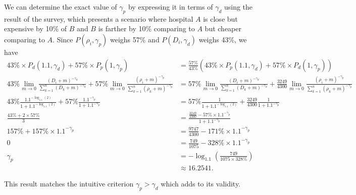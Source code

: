 \documentclass{article}
\begin{document}
We can determine the exact value of $\gamma_p$ by expressing it in terms of $\gamma_d$ using the result of the survey, which presents a scenario where hospital $A$ is close but expensive by 10\% of $B$ and $B$ is farther by 10\% comparing to $A$ but cheaper comparing to $A$. Since $P \left(\rho_i, \gamma_p\right)$ weighs 57\% and $P \left(D_i,\gamma_d \right)$ weighs 43\%, we have
\begin{align}
    43\% \times P_d \left(1.1,\gamma_d \right) + 57\% \times P_p \left(1, \gamma_p\right) & = \frac{57\%}{43\%} \left(43\% \times P_p \left(1.1,\gamma_d \right) + 57\% \times P_d \left(1, \gamma_p\right)\right) \\
   \displaystyle 43\% \lim_{m \to 0} \frac{(D_i + m)^{-\gamma_d}}{\displaystyle\sum_{k=1}^n (D_k + m)^{-\gamma_d}} + 57\% \lim_{m \to 0} \frac{(\rho_i + m)^{-\gamma_p}}{\displaystyle\sum_{k=1}^n (\rho_k + m)^{-\gamma_p}} & = 57\% \lim_{m \to 0} \frac{(D_i + m)^{-\gamma_d}}{\displaystyle\sum_{k=1}^n (D_k + m)^{-\gamma_d}} + \frac{3249}{4300} \lim_{m \to 0} \frac{(\rho_i + m)^{-\gamma_p}}{\displaystyle\sum_{k=1}^n (\rho_k + m)^{-\gamma_p}} \\
  43\% \frac{1.1^{-\log_{1.1}(2)}}{1 + 1.1^{-\log_{1.1}(2)}} + 57\%\frac{1.1^{-\gamma_p}}{1+1.1^{-\gamma_p}} & = 57\%\frac{1}{1 + 1.1^{-\log_{1.1}(2)}} + \frac{3249}{4300}\frac{1}{1 + 1.1^{-\gamma_p}}\\
  \frac{43\% + 2 \times 57\%}{3} & = \frac{\frac{3249}{4300} - 57\% \times 1.1^{-\gamma_p}}{1 + 1.1^{-\gamma_p}}\\
  157\% + 157\% \times 1.1^{-\gamma_p} & = \frac{9747}{4300} - 171\% \times 1.1^{-\gamma_p}\\
  0 & = \frac{749}{1075} - 328\% \times 1.1^{-\gamma_p}\\
  \gamma_p & = -\log_{1.1}\left(\frac{749}{1075 \times 328\%}\right)\\ & \approx 16.2541.
\end{align}

This result matches the intuitive criterion $\gamma_p > \gamma_d$ which adds to its validity.
\end{document}
